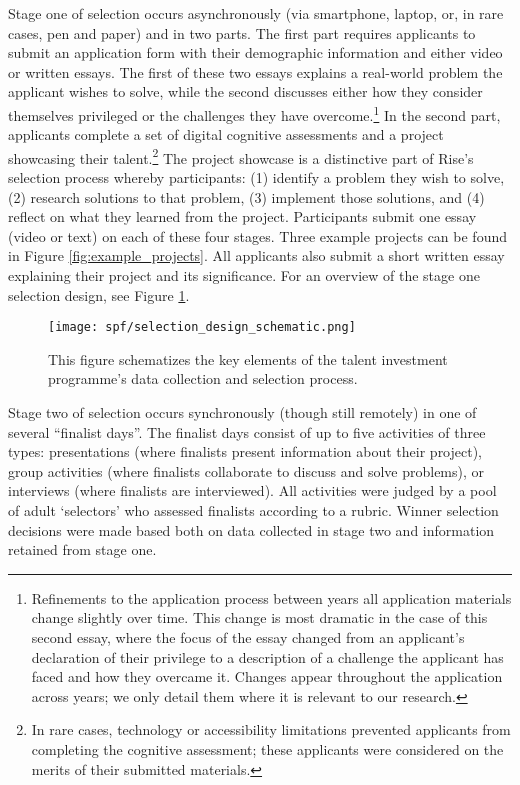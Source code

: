 Stage one of selection occurs asynchronously (via smartphone, laptop, or, in rare cases, pen and paper) and in two parts. The first part requires applicants to submit an application form with their demographic information and either video or written essays. The first of these two essays explains a real-world problem the applicant wishes to solve, while the second discusses either how they consider themselves privileged or the challenges they have overcome.\footnote{Refinements to the application process between years all application materials change slightly over time. This change is most dramatic in the case of this second essay, where the focus of the essay changed from an applicant's declaration of their privilege to a description of a challenge the applicant has faced and how they overcame it. Changes appear throughout the application across years; we only detail them where it is relevant to our research.} In the second part, applicants complete a set of digital cognitive assessments and a project showcasing their talent.\footnote{In rare cases, technology or accessibility limitations prevented applicants from completing the cognitive assessment; these applicants were considered on the merits of their submitted materials.} The project showcase is a distinctive part of Rise's selection process whereby participants: (1) identify a problem they wish to solve, (2) research solutions to that problem, (3) implement those solutions, and (4) reflect on what they learned from the project. Participants submit one essay (video or text) on each of these four stages. Three example projects can be found in Figure \ref{fig:example_projects}. All applicants also submit a short written essay explaining their project and its significance. For an overview of the stage one selection design, see Figure \ref{fig:design}.

\begin{figure}[!htb]
    \centering
    \caption{This figure schematizes the key elements of the talent investment programme's data collection and selection process. }
    \label{fig:design}
    \texttt{[image: spf/selection\_design\_schematic.png]} 
\end{figure}

Stage two of selection occurs synchronously (though still remotely) in one of several ``finalist days''. The finalist days consist of up to five activities of three types: presentations (where finalists present information about their project), group activities (where finalists collaborate to discuss and solve problems), or interviews (where finalists are interviewed). All activities were judged by a pool of adult `selectors' who assessed finalists according to a rubric. Winner selection decisions were made based both on data collected in stage two and information retained from stage one.

